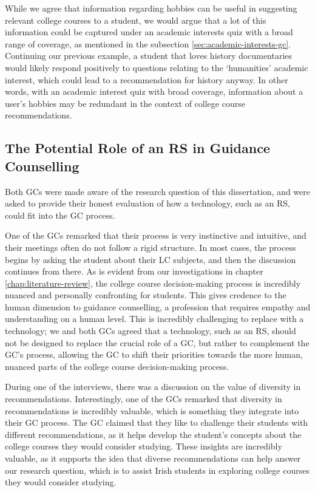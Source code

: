 While we agree that information regarding hobbies can be useful 
in suggesting relevant college courses to a student,
we would argue that a lot of this information could be captured under an academic interests quiz with a 
broad range of coverage, as mentioned in the subsection \ref{sec:academic-interests-gc}.
Continuing our previous example, a student that loves history documentaries would likely respond positively to 
questions relating to the `humanities' academic interest, which could lead to a recommendation for history anyway. 
In other words, with an academic interest quiz with broad coverage, 
information about a user's hobbies may be redundant in the context of college course recommendations.

\subsection{The Potential Role of an RS in Guidance Counselling}

Both GCs were made aware of the research question of this dissertation, and 
were asked to provide their honest evaluation of how a technology, such as an RS, 
could fit into the GC process.

One of the GCs remarked that their process is very instinctive and intuitive, 
and their meetings often do not follow a rigid structure.
In most cases, the process begins by asking the student about their LC subjects, and then the discussion continues from there.
As is evident from our investigations in chapter \ref{chap:literature-review}, 
the college course decision-making process is incredibly nuanced and personally confronting for students.
This gives credence to the human dimension to guidance counselling, 
a profession that requires empathy and understanding on a human level.
This is incredibly challenging to replace with a technology;
we and both GCs agreed that a technology, such as an RS, should not be designed 
to replace the crucial role of a GC, but rather to complement the GC's process,
allowing the GC to shift their priorities towards the more human, nuanced parts of the college course decision-making process.

During one of the interviews, there was a discussion on the value of diversity in recommendations.
Interestingly, one of the GCs remarked that diversity in recommendations is incredibly valuable, 
which is something they integrate into their GC process.
The GC claimed that they like to challenge their students with different recommendations,
as it helps develop the student's concepts about the college courses they would consider studying.
These insights are incredibly valuable, as it supports the idea that diverse recommendations 
can help answer our research question, which is to assist Irish students in exploring college courses they would consider studying.

